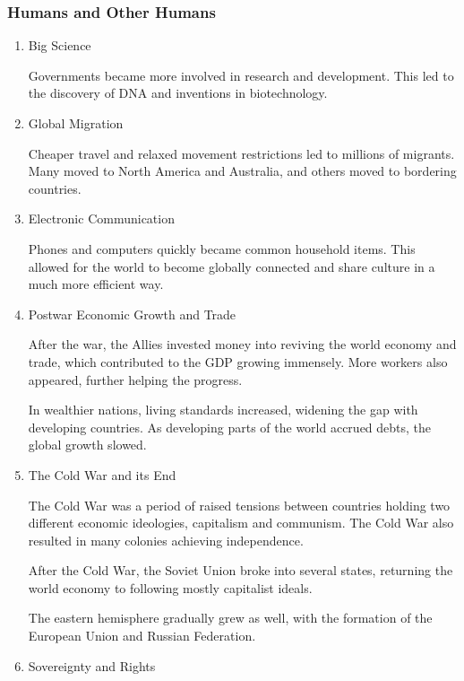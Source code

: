 \documentclass[11pt]{article}
\begin{document}
\subsubsection{Humans and Other Humans}
\label{sec:orga530662}
\begin{enumerate}
\item Big Science
\label{sec:org38ec80d}

Governments became more involved in research and development. This led to the discovery of DNA and inventions in biotechnology.

\item Global Migration
\label{sec:orgc6630b0}

Cheaper travel and relaxed movement restrictions led to millions of migrants. Many moved to North America and Australia, and others moved to bordering countries.

\item Electronic Communication
\label{sec:orgf72f205}

Phones and computers quickly became common household items. This allowed for the world to become globally connected and share culture in a much more efficient way.

\item Postwar Economic Growth and Trade
\label{sec:org6b4e73c}

After the war, the Allies invested money into reviving the world economy and trade, which contributed to the GDP growing immensely. More workers also appeared, further helping the progress.

In wealthier nations, living standards increased, widening the gap with developing countries. As developing parts of the world accrued debts, the global growth slowed.

\item The Cold War and its End
\label{sec:orgea21adc}

The Cold War was a period of raised tensions between countries holding two different economic ideologies, capitalism and communism. The Cold War also resulted in many colonies achieving independence.

After the Cold War, the Soviet Union broke into several states, returning the world economy to following mostly capitalist ideals.

The eastern hemisphere gradually grew as well, with the formation of the European Union and Russian Federation.

\item Sovereignty and Rights
\label{sec:org7bd7a97}


\end{enumerate}
\end{document}
